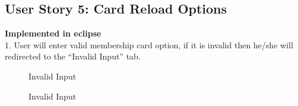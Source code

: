 \documentclass[12pt]{report}
\begin{document}
\FloatBarrier
\subsection{User Story 5: Card Reload Options}

\textbf{Implemented in eclipse} \\

1.	User will enter valid membership card option, if it is invalid then he/she will redirected to the “Invalid Input” tab.
\begin{figure}[H]
	\caption{\label{fig:invalidinput}Invalid Input}	
\end{figure}


\begin{figure}[H]
	\caption{\label{fig:invalidinput2}Invalid Input}	
\end{figure}
\end{document}
